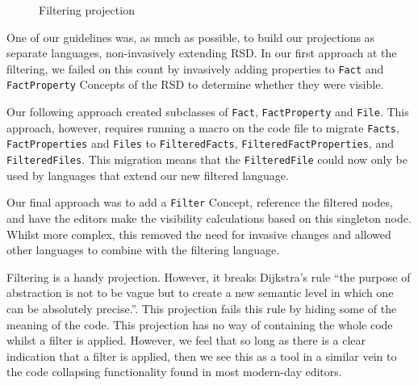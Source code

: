 \begin{figure}
    \centering
    \caption{Filtering projection}
    \label{fig:filteringProjection}
\end{figure}

One of our guidelines was, as much as possible, to build our projections as separate languages, non-invasively extending RSD.
In our first approach at the filtering, we failed on this count by invasively adding properties to \texttt{Fact} and \texttt{FactProperty} Concepts of the RSD to determine whether they were visible.

Our following approach created subclasses of \texttt{Fact}, \texttt{FactProperty} and \texttt{File}.
This approach, however, requires running a macro on the code file to migrate \texttt{Facts}, \texttt{FactProperties} and \texttt{Files} to \texttt{FilteredFacts}, \texttt{FilteredFactProperties}, and \texttt{FilteredFiles}.
This migration means that the \texttt{FilteredFile} could now only be used by languages that extend our new filtered language.

Our final approach was to add a \texttt{Filter} Concept, reference the filtered nodes, and have the editors make the visibility calculations based on this singleton node.
Whilst more complex, this removed the need for invasive changes and allowed other languages to combine with the filtering language.

Filtering is a handy projection.
However, it breaks Dijkstra's rule ``the purpose of abstraction is not to be vague but to create a new semantic level in which one can be absolutely precise.''\cite{dijkstra1972humble}.
This projection fails this rule by hiding some of the meaning of the code.
This projection has no way of containing the whole code whilst a filter is applied.
However, we feel that so long as there is a clear indication that a filter is applied, then we see this as a tool in a similar vein to the code collapsing functionality found in most modern-day editors.

